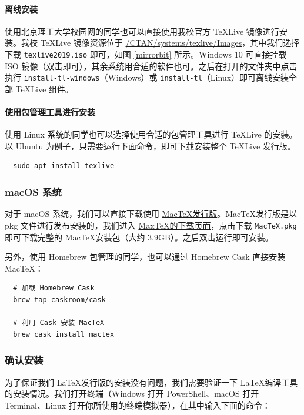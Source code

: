\paragraph{离线安装} 使用北京理工大学校园网的同学也可以直接使用我校官方 \TeX Live 镜像进行安装。我校 \TeX Live 镜像资源位于 \href{https://mirrors.bit.edu.cn/CTAN/systems/texlive/Images}{/CTAN/systems/texlive/Images}，其中我们选择下载 \texttt{texlive2019.iso} 即可，如图 \ref{mirrorbit} 所示。Windows 10 可直接挂载 ISO 镜像（双击即可），其余系统用合适的软件也可。之后在打开的文件夹中点击执行 \texttt{install-tl-windows}（Windows）或 \texttt{install-tl}（Linux）即可离线安装全部 \TeX Live 组件。

\paragraph{使用包管理工具进行安装} 使用 Linux 系统的同学也可以选择使用合适的包管理工具进行 \TeX Live 的安装。以 Ubuntu 为例子，只需要运行下面命令，即可下载安装整个 \TeX Live 发行版。

\begin{verbatim}
  sudo apt install texlive
\end{verbatim}

\subsubsection{macOS 系统}
对于 macOS 系统，我们可以直接下载使用 \href{https://www.tug.org/mactex/}{Mac\TeX 发行版}。Mac\TeX 发行版是以 pkg 文件进行发布安装的，我们进入 \href{https://www.tug.org/mactex/mactex-download.html}{Max\TeX 的下载页面}，点击下载 \texttt{MacTeX.pkg} 即可下载完整的 Mac\TeX 安装包（大约 3.9GB）。之后双击运行即可安装。

另外，使用 Homebrew 包管理的同学，也可以通过 Homebrew Cask 直接安装 Mac\TeX：

\begin{verbatim}
  # 加载 Homebrew Cask
  brew tap caskroom/cask

  # 利用 Cask 安装 MacTeX
  brew cask install mactex
\end{verbatim}

\subsubsection{确认安装}
为了保证我们 \LaTeX 发行版的安装没有问题，我们需要验证一下 \LaTeX 编译工具的安装情况。我们打开终端（Windows 打开 PowerShell、macOS 打开 Terminal、Linux 打开你所使用的终端模拟器），在其中输入下面的命令：

